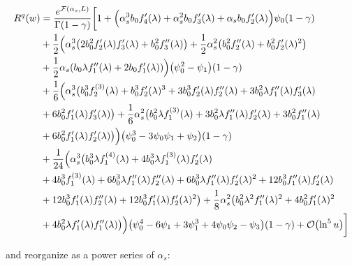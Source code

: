 \documentclass[../main.tex]{subfiles}
\begin{document}
\begin{align}
    \begin{split}
        R^q(w) &= \frac{e^{\mathcal{F}(\alpha_s,L)}}{\Gamma(1-\gamma)} \biggl[ 1 + \Bigl(\alpha_s^3 b_0 f_4'(\lambda )+\alpha_s^2 b_0 f_3'(\lambda )+\alpha_s b_0 f_2'(\lambda )\Bigr) \psi_0(1-\gamma) \\
        &+ \frac{1}{2} \Bigl(\alpha_s^3 \bigl(2 b_0^2 f_2'(\lambda ) f_3'(\lambda )+b_0^2 f_3''(\lambda )\bigr)+ \frac{1}{2} \alpha_s^2 \qty(b_0^2 f_2''(\lambda )+b_0^2 f_2'(\lambda )^2 ) \\
        &+\frac{1}{2} \alpha_s \qty(b_0 \lambda  f_1''(\lambda ) + 2 b_0 f_1'(\lambda ) )\Bigr) \qty(\psi_0^2-\psi_1)(1-\gamma) \\
        &+ \frac{1}{6}\Bigl( \alpha_s^3 \bigl(b_0^3 f_2^{(3)}(\lambda )+b_0^3 f_2'(\lambda )^3 + 3 b_0^3 f_2'(\lambda ) f_2''(\lambda )+3 b_0^2 \lambda  f_1''(\lambda ) f_3'(\lambda ) \\
        &+6 b_0^2 f_1'(\lambda ) f_3'(\lambda )\bigr) +\frac{1}{6} \alpha_s^2 \bigl(b_0^2 \lambda  f_1^{(3)}(\lambda )+3 b_0^2 \lambda  f_1''(\lambda ) f_2'(\lambda )+3 b_0^2 f_1''(\lambda )\\
        &+6 b_0^2 f_1'(\lambda ) f_2'(\lambda )\bigr) \Bigr) \qty(\psi_0^3 -3 \psi_0\psi_1+\psi_2)(1-\gamma) \\
        &+ \frac{1}{24}\Bigl(\alpha_s^3 \bigl(b_0^3 \lambda  f_1^{(4)}(\lambda )+4 b_0^3 \lambda  f_1^{(3)}(\lambda ) f_2'(\lambda )\\
        &+4 b_0^3 f_1^{(3)}(\lambda )+6 b_0^3 \lambda  f_1''(\lambda ) f_2''(\lambda )+6 b_0^3 \lambda  f_1''(\lambda ) f_2'(\lambda )^2+12 b_0^3 f_1''(\lambda ) f_2'(\lambda )\\
        &+12 b_0^3 f_1'(\lambda ) f_2''(\lambda )+12 b_0^3 f_1'(\lambda ) f_2'(\lambda )^2\bigr)+\frac{1}{8} \alpha_s^2 \bigl(b_0^2 \lambda ^2 f_1''(\lambda )^2+4 b_0^2 f_1'(\lambda )^2\\
        &+4 b_0^2 \lambda  f_1'(\lambda ) f_1''(\lambda )\bigr)\Bigr) \qty(\psi_0^4 -6 \psi_1 + 3\psi_1^3 +4\psi_0\psi_2 -\psi_3)(1-\gamma)+ \order{\ln^5 u} \biggr]
    \end{split}
\end{align}

and reorganize as a power series of $\alpha_s$:
\end{document}
